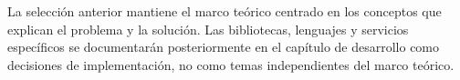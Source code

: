 La selección anterior mantiene el marco teórico centrado en los conceptos que explican el problema y la solución. Las bibliotecas, lenguajes y servicios específicos se documentarán posteriormente en el capítulo de desarrollo como decisiones de implementación, no como temas independientes del marco teórico.
